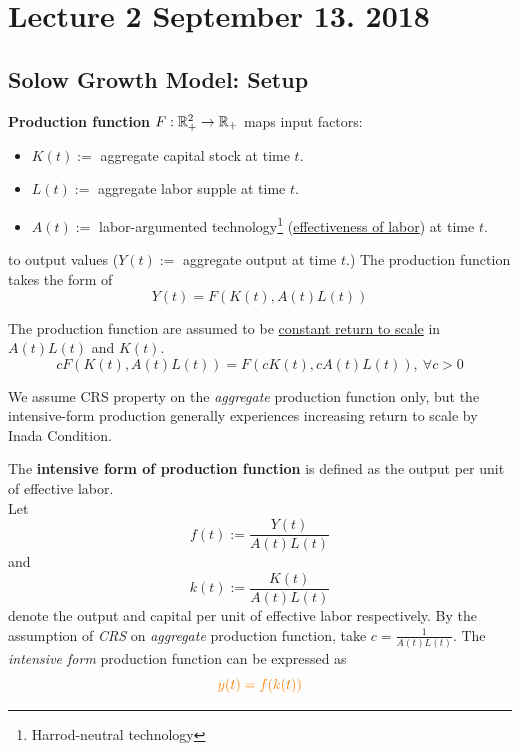 \documentclass[11pt]{article}
\begin{document}
	\section{Lecture 2 September 13. 2018}
		\subsection{Solow Growth Model: Setup}
			\begin{definition}
				\textbf{Production function} $F: \mathbb{R}^2_{+} \rightarrow \mathbb{R}_+$ maps input factors:
				\begin{itemize}
					\item $K(t) := $ aggregate capital stock at time $t$.
					\item $L(t) := $ aggregate labor supple at time $t$.
					\item $A(t) := $ labor-argumented technology\footnote{Harrod-neutral technology} (\ul{effectiveness of labor}) at time $t$.
				\end{itemize} 
				to output values ($Y(t) := $ aggregate output at time $t$.) The production function takes the form of
				\begin{equation}
					Y(t) = F(K(t), A(t)L(t))
				\end{equation}
			\end{definition}
			
			\begin{assumption}
				The production function are assumed to be \ul{constant return to scale} in $A(t)L(t)$ and $K(t)$.
				\begin{equation}
					cF(K(t), A(t)L(t)) = F(cK(t), cA(t)L(t)),\ \forall c > 0
				\end{equation}
			\end{assumption}
			
			\begin{remark}
				We assume CRS property on the \emph{aggregate} production function only, but the intensive-form production generally experiences increasing return to scale by Inada Condition.
			\end{remark}
			
			\begin{definition}
				The \textbf{intensive form of production function} is defined as the output per unit of effective labor. \\
				Let 
				\begin{equation}
					f(t) := \frac{Y(t)}{A(t)L(t)}
				\end{equation}
				and 
				\begin{equation}
					k(t) := \frac{K(t)}{A(t)L(t)}
				\end{equation}
				denote the output and capital per unit of effective labor respectively. By the assumption of \emph{CRS} on \emph{aggregate} production function, take $c = \frac{1}{A(t)L(t)}$. The \emph{intensive form} production function can be expressed as
				\begin{equation}
					\textcolor{orange}{
						y(t) = f(k(t))
					}
				\end{equation}
			\end{definition}
			
\end{document}
